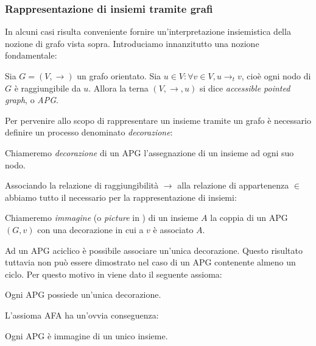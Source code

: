 \subsubsection{Rappresentazione di insiemi tramite grafi}
\label{sec:graphs_sets}
In alcuni casi risulta conveniente fornire un'in\-ter\-pre\-ta\-zio\-ne insiemistica della nozione di grafo vista sopra. Introduciamo innanzitutto una nozione fondamentale:
\begin{definition}
    Sia $G = (V, \to)$ un grafo orientato. Sia $u \in V : \forall v \in V, u \to_t v$, cioè ogni nodo di $G$ è raggiungibile da $u$. Allora la terna $(V, \to, u)$ si dice \emph{accessible pointed graph}, o \emph{APG}.
\end{definition}
Per pervenire allo scopo di rappresentare un insieme tramite un grafo è necessario definire un processo denominato \emph{decorazione}:
\begin{definition}
    Chiameremo \emph{decorazione} di un APG l'assegnazione di un insieme ad ogni suo nodo.
\end{definition}
Associando la relazione di raggiungibilità $\to$ alla relazione di appartenenza $\in$ abbiamo tutto il necessario per la rappresentazione di insiemi:
\begin{definition}
    Chiameremo \emph{immagine} (o \emph{picture} in \cite{aczel}) di un insieme $A$ la coppia di un APG $(G,v)$ con una decorazione in cui a $v$ è associato $A$.
\end{definition}
Ad un APG aciclico è possibile associare un'unica decorazione. Questo risultato tuttavia non può essere dimostrato nel caso di un APG contenente almeno un ciclo. Per questo motivo in \cite{aczel} viene dato il seguente assioma:
\begin{axiom}
    Ogni APG possiede un'unica decorazione.
\end{axiom}
L'assioma AFA ha un'ovvia conseguenza:
\begin{corollary}
    Ogni APG è immagine di un unico insieme.
\end{corollary}
